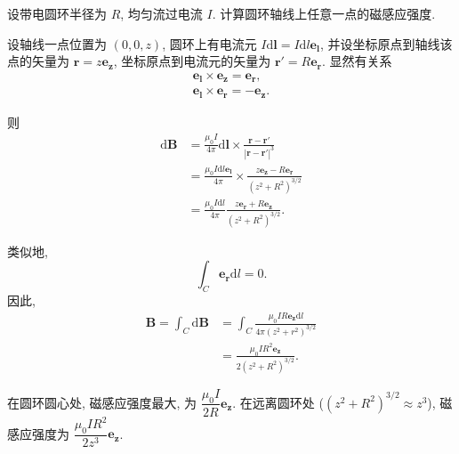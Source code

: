 \begin{exampleprob}[均匀电流圆环的磁感应强度]
    设带电圆环半径为 $R$, 均匀流过电流 $I$. 计算圆环轴线上任意一点的磁感应强度.

    \begin{solution}
        设轴线一点位置为 $(0,0,z)$, 圆环上有电流元 $I\mathrm{d}\bm{l}=I\mathrm{d}l\bm{e_l}$, 并设坐标原点到轴线该点的矢量为 $\bm{r}=z\bm{e_z}$, 坐标原点到电流元的矢量为 $\bm{r'}=R\bm{e_r}$. 显然有关系
        \begin{gather*}
            \bm{e_l}\times\bm{e_z}=\bm{e_r}, \\
            \bm{e_l}\times\bm{e_r}=-\bm{e_z}.
        \end{gather*}

        则
        \begin{align*}
            \mathrm{d}\bm{B} & =\frac{\mu_0I}{4\pi}\mathrm{d}\bm{l}\times\frac{\bm{r}-\bm{r'}}{|\bm{r}-\bm{r'}|^3}      \\
                             & =\frac{\mu_0I\mathrm{d}l\bm{e_l}}{4\pi}\times\frac{z\bm{e_z}-R\bm{e_r}}{(z^2+R^2)^{3/2}} \\
                             & =\frac{\mu_0I\mathrm{d}l}{4\pi}\frac{z\bm{e_r}+R\bm{e_z}}{(z^2+R^2)^{3/2}}.
        \end{align*}

        类似地,
        \begin{equation*}
            \int_C\bm{e_r}\mathrm{d}l=0.
        \end{equation*}
        因此,
        \begin{align*}
            \bm{B}=\int_C\mathrm{d}\bm{B} & =\int_C\frac{\mu_0IR\bm{e_z}\mathrm{d}l}{4\pi(z^2+r^2)^{3/2}} \\
                                          & =\frac{\mu_0IR^2\bm{e_z}}{2(z^2+R^2)^{3/2}}.
        \end{align*}

        在圆环圆心处, 磁感应强度最大, 为 $\dfrac{\mu_0I}{2R}\bm{e_z}$. 在远离圆环处 ($(z^2+R^2)^{3/2}\approx z^3$), 磁感应强度为 $\dfrac{\mu_0IR^2}{2z^3}\bm{e_z}$.
    \end{solution}
\end{exampleprob}
